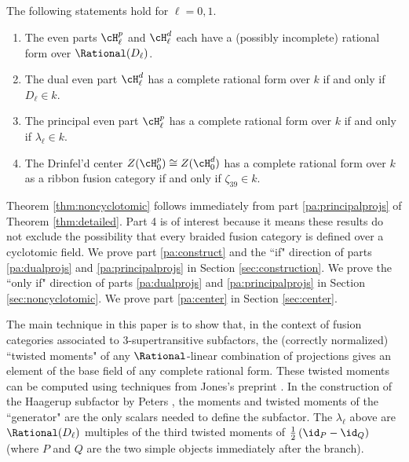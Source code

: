 \documentclass{gtart}
\begin{document}
\begin{thm} \label{thm:detailed}
The following statements hold for $\ell = 0,1$.
\begin{enumerate}
\item \label{pa:construct} The even parts $\cH_\ell^p$ and $\cH_\ell^d$ each have a (possibly incomplete) rational form over $\Rational(D_\ell)$.
\item \label{pa:dualprojs} The dual even part $\cH_\ell^d$ has a complete rational form over $k$ if and only if $D_\ell \in k$.
\item \label{pa:principalprojs} The principal even part $\cH_\ell^p$ has a complete rational form over $k$ if and only if $\lambda_\ell \in k$.
\item \label{pa:center} The Drinfel'd center $Z(\cH_0^p) \cong Z(\cH_0^d)$ has a complete rational form over $k$ as a ribbon fusion category if and only if $\zeta_{39} \in k$.
\end{enumerate}
\end{thm}

Theorem \ref{thm:noncyclotomic} follows immediately from part \ref{pa:principalprojs} of Theorem \ref{thm:detailed}.  Part 4 is of interest because it means these results do not exclude the possibility that every braided fusion category is defined over a cyclotomic field.  We prove part \ref{pa:construct} and the ``if" direction of parts \ref{pa:dualprojs} and \ref{pa:principalprojs} in Section \ref{sec:construction}.  We prove the ``only if" direction of parts \ref{pa:dualprojs} and \ref{pa:principalprojs} in Section \ref{sec:noncyclotomic}.  We prove part \ref{pa:center} in Section \ref{sec:center}.

The main technique in this paper is to show that, in the context of fusion categories associated to 3-supertransitive subfactors, the (correctly normalized) ``twisted moments" of any $\Rational$-linear combination of projections gives an element of the base field of any complete rational form.  These twisted moments can be computed using techniques from Jones's preprint \cite{quadratic}.  In the construction of the Haagerup subfactor by Peters \cite{0902.1294}, the moments and twisted moments of the ``generator" are the only scalars needed to define the subfactor.  The $\lambda_\ell$ above are $\Rational(D_\ell)$ multiples of the third twisted moments of $\frac{1}{2}\left(\id_P-\id_Q\right)$ (where $P$ and $Q$ are the two simple objects immediately after the branch).
\end{document}

